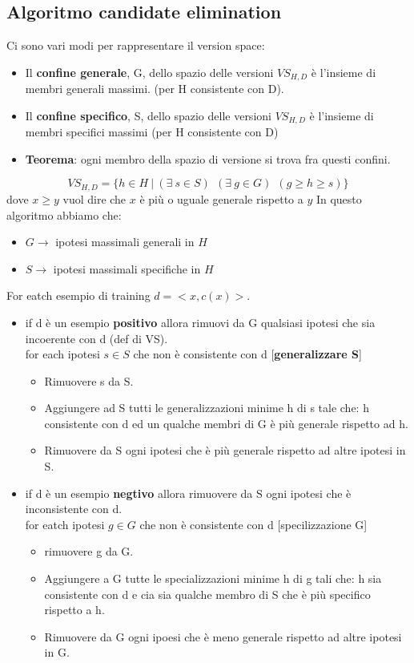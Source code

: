 \subsection{Algoritmo candidate elimination}
\begin{definition}
    Ci sono vari modi per rappresentare il version space:
    \begin{itemize}
        \item Il \textbf{confine generale}, G, dello spazio delle versioni $VS_{H,D}$ è l'insieme di 
        membri generali massimi. (per H consistente con D).
        \item Il \textbf{confine specifico}, S, dello spazio delle versioni $VS_{H,D}$ è l'insieme di
        membri specifici massimi (per H consistente con D)
        \item \textbf{Teorema}: ogni membro della spazio di versione si trova fra questi confini.
    \end{itemize}
\end{definition}
$$VS_{H,D} = \{h \in H \:|\: (\exists \: s \in S) \:\: (\exists \: g \in G) \:\:(g \geq h \geq s)\}$$
dove $x \geq y$ vuol dire che $x$ è più o uguale generale rispetto a $y$
In questo algoritmo abbiamo che:
\begin{itemize}
    \item $G \to$ ipotesi massimali generali in $H$
    \item $S \to$ ipotesi massimali specifiche in $H$
\end{itemize}
For eatch esempio di training $d = <x, c(x)>$.
\begin{itemize}
    \item if d è un esempio \textbf{positivo} allora rimuovi da G qualsiasi ipotesi che sia incoerente con d (def di VS).\\
    for each ipotesi $s \in S$ che non è consistente con d [\textbf{generalizzare S}]
    \begin{itemize}
        \item Rimuovere s da S.
        \item Aggiungere ad S tutti le generalizzazioni minime h di s tale che: h consistente con d ed un qualche membri di G è più generale rispetto ad h.
        \item Rimuovere da S ogni ipotesi che è più generale rispetto ad altre ipotesi in S.
    \end{itemize}
    \item if d è un esempio \textbf{negtivo} allora rimuovere da S ogni ipotesi che è inconsistente con d.\\
    for eatch ipotesi $g \in G$ che non è consistente con d [specilizzazione G]
    \begin{itemize}
        \item rimuovere g da G.
        \item Aggiungere a G tutte le specializzazioni minime h di g tali che: h sia consistente con d e cia sia qualche membro di S che è più specifico rispetto a h.
        \item Rimuovere da G ogni ipoesi che è meno generale rispetto ad altre ipotesi in G.
    \end{itemize}
\end{itemize}

